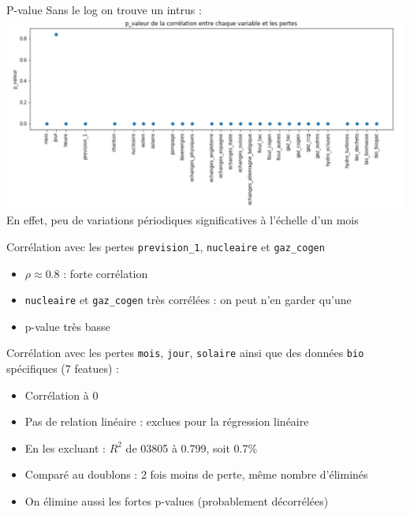 \begin{frame}{P-value}
\protect\hypertarget{p-value-1}{}
Sans le log on trouve un intrus :
\includegraphics[scale=.5]{figures/p_value.JPG} En effet, peu de
variations périodiques significatives à l'échelle d'un mois
\end{frame}

\begin{frame}[fragile]{Corrélation avec les pertes}
\protect\hypertarget{corruxe9lation-avec-les-pertes-1}{}
\texttt{prevision\_1}, \texttt{nucleaire} et \texttt{gaz\_cogen}

\begin{itemize}
\tightlist
\item
  \(\rho\approx 0.8\) : forte corrélation
\item
  \texttt{nucleaire} et \texttt{gaz\_cogen} très corrélées : on peut
  n'en garder qu'une
\item
  p-value très basse
\end{itemize}
\end{frame}

\begin{frame}[fragile]{Corrélation avec les pertes}
\protect\hypertarget{corruxe9lation-avec-les-pertes-2}{}
\texttt{mois}, \texttt{jour}, \texttt{solaire} ainsi que des données
\texttt{bio} spécifiques (7 featues) :

\begin{itemize}
\tightlist
\item
  Corrélation à 0
\item
  Pas de relation linéaire : exclues pour la régression linéaire
\item
  En les excluant : \(R^2\) de 03805 à 0.799, soit 0.7\%
\item
  Comparé au doublons : 2 fois moins de perte, même nombre d'éliminés
\item
  On élimine aussi les fortes p-values (probablement décorrélées)
\end{itemize}
\end{frame}


